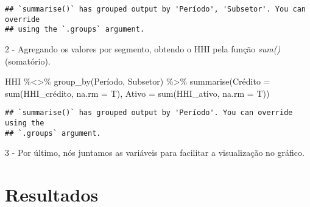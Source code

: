 \documentclass[
]{article}
\newenvironment{Shaded}{\begin{snugshade}}{\end{snugshade}}
\newcommand{\AttributeTok}[1]{\textcolor[rgb]{0.77,0.63,0.00}{#1}}
\newcommand{\FunctionTok}[1]{\textcolor[rgb]{0.00,0.00,0.00}{#1}}
\newcommand{\NormalTok}[1]{#1}
\newcommand{\OtherTok}[1]{\textcolor[rgb]{0.56,0.35,0.01}{#1}}
\newcommand{\SpecialCharTok}[1]{\textcolor[rgb]{0.00,0.00,0.00}{#1}}
\newcommand{\StringTok}[1]{\textcolor[rgb]{0.31,0.60,0.02}{#1}}
\begin{document}
\begin{verbatim}
## `summarise()` has grouped output by 'Período', 'Subsetor'. You can override
## using the `.groups` argument.
\end{verbatim}

2 - Agregando os valores por segmento, obtendo o HHI pela função
\emph{sum()} (somatório).

\begin{Shaded}
\begin{Highlighting}[]
\NormalTok{HHI }\SpecialCharTok{\%\textless{}\textgreater{}\%}
  \FunctionTok{group\_by}\NormalTok{(Período, Subsetor) }\SpecialCharTok{\%\textgreater{}\%}
  \FunctionTok{summarise}\NormalTok{(Crédito }\OtherTok{=} \FunctionTok{sum}\NormalTok{(HHI\_crédito, }\AttributeTok{na.rm =}\NormalTok{ T),}
            \StringTok{\textasciigrave{}}\AttributeTok{Ativo}\StringTok{\textasciigrave{}} \OtherTok{=} \FunctionTok{sum}\NormalTok{(HHI\_ativo, }\AttributeTok{na.rm =}\NormalTok{ T))}
\end{Highlighting}
\end{Shaded}

\begin{verbatim}
## `summarise()` has grouped output by 'Período'. You can override using the
## `.groups` argument.
\end{verbatim}

3 - Por último, nós juntamos as variáveis para facilitar a visualização
no gráfico.

\hypertarget{resultados}{%
\section{Resultados}\label{resultados}}
\end{document}
